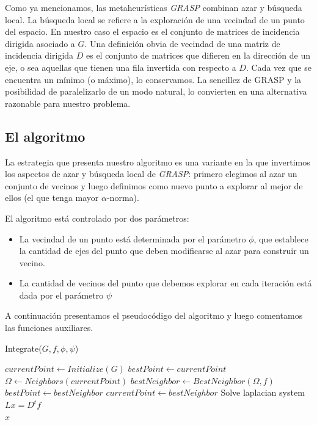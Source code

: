 \documentclass[conference,compsoc,a4paper]{IEEEtran}
\begin{document}
\smallskip

Como ya mencionamos, las metaheurísticas \textit{GRASP} combinan azar y 
búsqueda local. La búsqueda local se refiere a la exploración de 
una vecindad de un punto del espacio. En nuestro caso el espacio es el 
conjunto de matrices de incidencia dirigida asociado a $G$. Una 
definición obvia de vecindad de una matriz de incidencia dirigida $D$ es 
el conjunto de matrices que difieren en la dirección de un eje, o sea 
aquellas que tienen una fila invertida con respecto a $D$. Cada vez que 
se encuentra un mínimo (o máximo), lo conservamos. La sencillez de 
GRASP y la posibilidad de paralelizarlo de un modo natural, lo 
convierten en una alternativa razonable para nuestro problema.

\subsection{El algoritmo}

La estrategia que presenta nuestro algoritmo es una variante en la que 
invertimos los aspectos de azar y búsqueda local de \textit{GRASP}: 
primero elegimos al azar un conjunto de vecinos y luego definimos como 
nuevo punto a explorar al mejor de ellos (el que tenga mayor 
$\alpha$-norma). 

\smallskip

El algoritmo está controlado por dos parámetros:

\begin{itemize}
	\item La vecindad de un punto está determinada por el parámetro 
	$\phi$, que establece la cantidad de ejes del punto que deben 
	modificarse al azar para construir un vecino.
	\item La cantidad de vecinos del punto que debemos explorar en cada 
	iteración está dada por el parámetro $\psi$
\end{itemize}

A continuación presentamos el pseudocódigo del algoritmo y luego 
comentamos las funciones auxiliares.

\begin{algorithm}
    \caption{Integrate($G,f,\phi,\psi$)}
	\begin{algorithmic}
		\State $currentPoint \gets Initialize(G)$
		\State $bestPoint \gets currentPoint$
			\State $\Omega \gets Neighbors(currentPoint)$
			\State $bestNeighbor \gets BestNeighbor(\Omega,f)$
				\State $bestPoint \gets bestNeighbor$
			\EndIf
			\State $currentPoint \gets bestNeighbor$
		\EndWhile
		\State Solve laplacian system $L x = D^t f$ \\
		\Return $x$
	\end{algorithmic}
	\label{alg:alg1}
\end{algorithm}
\end{document}
